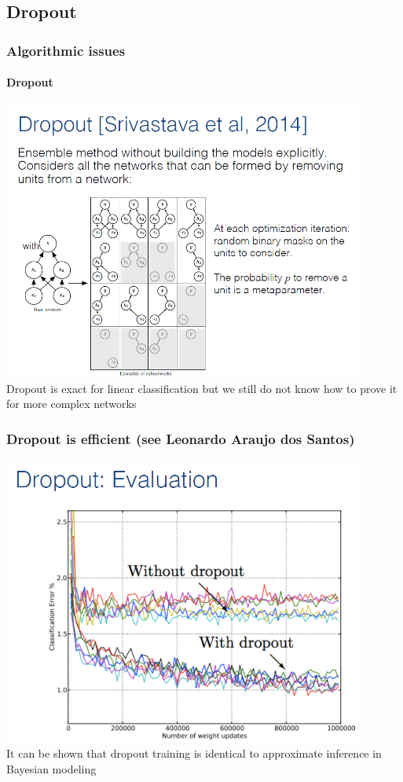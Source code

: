 \documentclass{beamer}
\begin{document}
\subsection{Dropout}
\begin{frame}
\frametitle{Algorithmic issues}
\framesubtitle{Dropout}
\includegraphics[width=0.9\textwidth]{images/drop_out_1.PNG} \\
Dropout is exact for linear classification but we still do not know how to prove it for more complex networks
\end{frame}
\begin{frame}
\frametitle{Dropout is efficient (see Leonardo Araujo dos Santos)}
\includegraphics[width=0.9\textwidth]{images/drop_out_6.PNG} \\
It can be shown that dropout training is identical to approximate
inference in Bayesian modeling  \cite{Gal 2016}
\end{frame}
\end{document}
